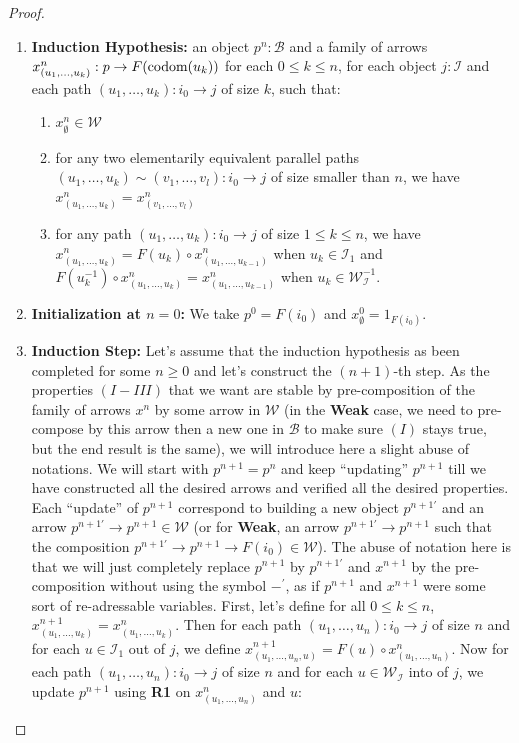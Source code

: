 \documentclass{article}
\numberwithin{equation}{section}
\theoremstyle{definition}
\theoremstyle{plain}
\begin{document}
\begin{proof}
\begin{enumerate}
\begin{enumerate}[label = $\bullet$]
	\item \textbf{Induction Hypothesis:} an object $p^n: \mathcal{B}$ and a family of arrows $x^n_{(u_1, \dots, u_k)}: p \to F(\textnormal{codom}(u_k))$ for each $0 \le k \le n$, for each object $j:\mathcal{I}$ and each path $(u_1, \dots, u_k): i_0 \to j$ of size $k$, such that:
	\begin{enumerate}[label = $(\Roman*)$]
		\item $x^n_{\emptyset} \in \mathcal{W}$
		\item for any two elementarily equivalent parallel paths $(u_1, \dots, u_k) \sim (v_1, \dots, v_l): i_0 \to j$ of size smaller than $n$, we have $x^n_{(u_1, \dots, u_k)} = x^n_{(v_1, \dots, v_l)}$
		\item for any path $(u_1, \dots, u_k): i_0 \to j$ of size $1 \le k \le n$, we have $x^n_{(u_1, \dots, u_k)} = F(u_k) \circ x^n_{(u_1, \dots, u_{k-1})}$ when $u_k \in \mathcal{I}_1$ and $F(u_k^{-1}) \circ x^n_{(u_1, \dots, u_k)} = x^n_{(u_1, \dots, u_{k-1})}$ when $u_k \in \mathcal{W}_{\mathcal{I}}^{-1}$.
	\end{enumerate}
	\item \textbf{Initialization at $n=0$:} We take $p^0 = F(i_0)$ and $x^0_{\emptyset} = 1_{F(i_0)}$.
	\item \textbf{Induction Step:} Let's assume that the induction hypothesis as been completed for some $n\ge 0$ and let's construct the $(n+1)$-th step. As the properties $(I-III)$ that we want are stable by pre-composition of the family of arrows $x^n$ by some arrow in $\mathcal{W}$ (in the \textbf{Weak} case, we need to pre-compose by this arrow then a new one in $\mathcal{B}$ to make sure $(I)$ stays true, but the end result is the same), we will introduce here a slight abuse of notations. We will start with $p^{n+1} = p^n$ and keep ``updating'' $p^{n+1}$ till we have constructed all the desired arrows and verified all the desired properties. Each ``update'' of $p^{n+1}$ correspond to building a new object $p^{n+1\prime}$ and an arrow $p^{n+1\prime} \to p^{n+1} \in \mathcal{W}$ (or for \textbf{Weak}, an arrow $p^{n+1\prime} \to p^{n+1}$ such that the composition $p^{n+1\prime} \to p^{n+1} \to F(i_0) \in \mathcal{W}$). The abuse of notation here is that we will just completely replace $p^{n+1}$ by $p^{n+1\prime}$ and $x^{n+1}$ by the pre-composition without using the symbol $-^{\prime}$, as if $p^{n+1}$ and $x^{n+1}$ were some sort of re-adressable variables.
	First, let's define for all $0\le k \le n$, $x^{n+1}_{(u_1, \dots, u_k)} = x^n_{(u_1, \dots, u_k)}$. Then for each path $(u_1, \dots, u_n): i_0 \to j$ of size $n$ and for each $u \in \mathcal{I}_1$ out of $j$, we define $x^{n+1}_{(u_1, \dots, u_n, u)} = F(u) \circ x^{n}_{(u_1, \dots, u_n)}$. Now for each path $(u_1, \dots, u_n): i_0 \to j$ of size $n$ and for each $u \in \mathcal{W}_{\mathcal{I}}$ into of $j$, we update $p^{n+1}$ using \textbf{R1} on $x^{n}_{(u_1, \dots, u_n)}$ and $u$:

\end{enumerate}
\end{enumerate}
\end{proof}
\end{document}
